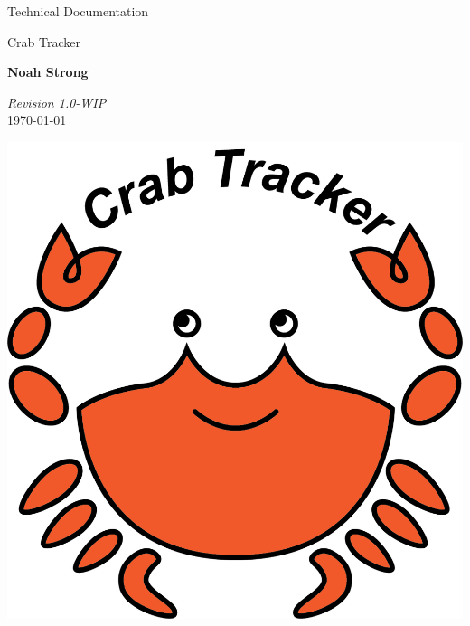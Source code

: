 \documentclass[12pt]{article}
\begin{document}
\begin{titlepage}

\vspace*{5cm}

\begin{huge}
Technical Documentation
\end{huge}

\begin{large}
Crab Tracker

\vspace*{1cm}

\textbf{Noah Strong}

\vspace*{1cm}
\end{large}

\textit{Revision 1.0-WIP}\\
\today

\vfill
\hfill \includegraphics[scale=1]{ct-logo.png}

\end{titlepage}
\tableofcontents{}

\newpage

\end{document}
